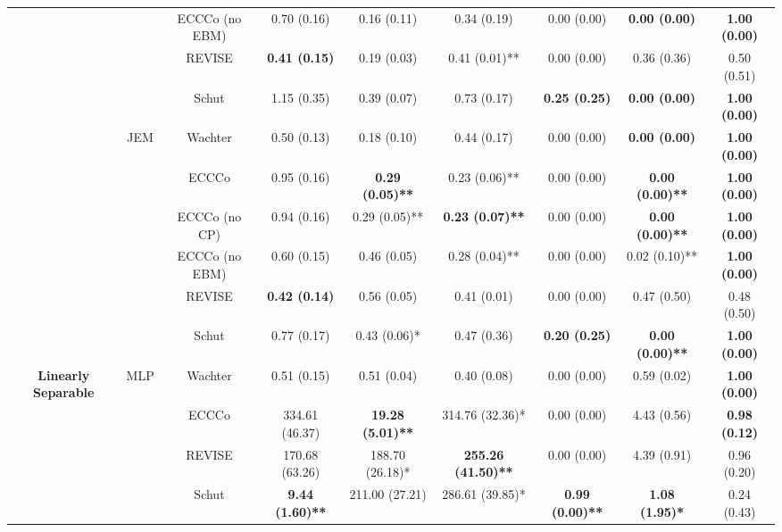 \begin{table}
{\begin{tabular}[t]{>{}c|c|c|c|c|c|c|c|c}
 &  & ECCCo (no EBM) & 0.70 (0.16) & 0.16 (0.11) & 0.34 (0.19) & 0.00 (0.00) & \textbf{0.00 (0.00)} & \textbf{1.00 (0.00)}\\

 &  & REVISE & \textbf{0.41 (0.15)} & 0.19 (0.03) & 0.41 (0.01)** & 0.00 (0.00) & 0.36 (0.36) & 0.50 (0.51)\\

 &  & Schut & 1.15 (0.35) & 0.39 (0.07) & 0.73 (0.17) & \textbf{0.25 (0.25)} & \textbf{0.00 (0.00)} & \textbf{1.00 (0.00)}\\

 & \multirow{-6}{*}{\centering\arraybackslash JEM} & Wachter & 0.50 (0.13) & 0.18 (0.10) & 0.44 (0.17) & 0.00 (0.00) & \textbf{0.00 (0.00)} & \textbf{1.00 (0.00)}\\
\cline{2-9}
 &  & ECCCo & 0.95 (0.16) & \textbf{0.29 (0.05)**} & 0.23 (0.06)** & 0.00 (0.00) & \textbf{0.00 (0.00)**} & \textbf{1.00 (0.00)}\\

 &  & ECCCo (no CP) & 0.94 (0.16) & 0.29 (0.05)** & \textbf{0.23 (0.07)**} & 0.00 (0.00) & \textbf{0.00 (0.00)**} & \textbf{1.00 (0.00)}\\

 &  & ECCCo (no EBM) & 0.60 (0.15) & 0.46 (0.05) & 0.28 (0.04)** & 0.00 (0.00) & 0.02 (0.10)** & \textbf{1.00 (0.00)}\\

 &  & REVISE & \textbf{0.42 (0.14)} & 0.56 (0.05) & 0.41 (0.01) & 0.00 (0.00) & 0.47 (0.50) & 0.48 (0.50)\\

 &  & Schut & 0.77 (0.17) & 0.43 (0.06)* & 0.47 (0.36) & \textbf{0.20 (0.25)} & \textbf{0.00 (0.00)**} & \textbf{1.00 (0.00)}\\

\multirow{-12}{*}{\centering\arraybackslash \textbf{Linearly Separable}} & \multirow{-6}{*}{\centering\arraybackslash MLP} & Wachter & 0.51 (0.15) & 0.51 (0.04) & 0.40 (0.08) & 0.00 (0.00) & 0.59 (0.02) & \textbf{1.00 (0.00)}\\
\cline{1-9}
 &  & ECCCo & 334.61 (46.37) & \textbf{19.28 (5.01)**} & 314.76 (32.36)* & 0.00 (0.00) & 4.43 (0.56) & \textbf{0.98 (0.12)}\\

 &  & REVISE & 170.68 (63.26) & 188.70 (26.18)* & \textbf{255.26 (41.50)**} & 0.00 (0.00) & 4.39 (0.91) & 0.96 (0.20)\\

 &  & Schut & \textbf{9.44 (1.60)**} & 211.00 (27.21) & 286.61 (39.85)* & \textbf{0.99 (0.00)**} & \textbf{1.08 (1.95)*} & 0.24 (0.43)\\


\end{tabular}}
\end{table}
